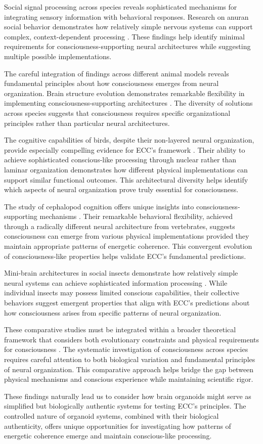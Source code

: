 Social signal processing across species reveals sophisticated mechanisms for integrating sensory information with behavioral responses. Research on anuran social behavior demonstrates how relatively simple nervous systems can support complex, context-dependent processing \cite{Wilczynski2010}. These findings help identify minimal requirements for consciousness-supporting neural architectures while suggesting multiple possible implementations.

The careful integration of findings across different animal models reveals fundamental principles about how consciousness emerges from neural organization. Brain structure evolution demonstrates remarkable flexibility in implementing consciousness-supporting architectures \cite{Northcutt2012}. The diversity of solutions across species suggests that consciousness requires specific organizational principles rather than particular neural architectures.

The cognitive capabilities of birds, despite their non-layered neural organization, provide especially compelling evidence for ECC's framework \cite{Clayton2015}. Their ability to achieve sophisticated conscious-like processing through nuclear rather than laminar organization demonstrates how different physical implementations can support similar functional outcomes. This architectural diversity helps identify which aspects of neural organization prove truly essential for consciousness.

The study of cephalopod cognition offers unique insights into consciousness-supporting mechanisms \cite{Mather2008}. Their remarkable behavioral flexibility, achieved through a radically different neural architecture from vertebrates, suggests consciousness can emerge from various physical implementations provided they maintain appropriate patterns of energetic coherence. This convergent evolution of consciousness-like properties helps validate ECC's fundamental predictions.

Mini-brain architectures in social insects demonstrate how relatively simple neural systems can achieve sophisticated information processing \cite{Menzel2001}. While individual insects may possess limited conscious capabilities, their collective behaviors suggest emergent properties that align with ECC's predictions about how consciousness arises from specific patterns of neural organization.

These comparative studies must be integrated within a broader theoretical framework that considers both evolutionary constraints and physical requirements for consciousness \cite{Roth2005}. The systematic investigation of consciousness across species requires careful attention to both biological variation and fundamental principles of neural organization. This comparative approach helps bridge the gap between physical mechanisms and conscious experience while maintaining scientific rigor.

These findings naturally lead us to consider how brain organoids might serve as simplified but biologically authentic systems for testing ECC's principles. The controlled nature of organoid systems, combined with their biological authenticity, offers unique opportunities for investigating how patterns of energetic coherence emerge and maintain conscious-like processing.